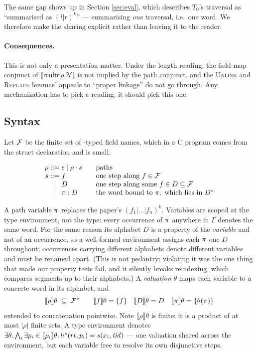 The same gap shows up in Section \ref{sec:eval}, which describes $T_0$'s
traversal as ``summarised as $(l|r)^{k}$'' --- summarising \emph{one} traversal,
i.e.\ one word.  We therefore make the sharing explicit rather than leaving it to
the reader.

\paragraph{Consequences.}  This is not only a presentation matter.  Under the
length reading, the field-map conjunct of $\llbracket \textsf{rcuItr}\,\rho\,
\mathcal{N} \rrbracket$ is not implied by the path conjunct, and the
\textsc{Unlink} and \textsc{Replace} lemmas' appeals to ``proper linkage'' do not
go through.  Any mechanization has to pick a reading; it should pick this one.

\subsection{Syntax}
\label{sec:pathfrag-syntax}

Let $\mathcal{F}$ be the finite set of \RCU-typed field names, which in a C program
comes from the struct declaration and is small.

\[
\begin{array}{r@{\;}c@{\;}l@{\qquad}l}
\rho &::=& \epsilon \mid \rho \cdot s & \text{paths} \\
s    &::=& f                 & \text{one step along } f \in \Fields \\
     &\mid& D                & \text{one step along some } f \in D \subseteq \Fields \\
     &\mid& \pvar : D        & \text{the word bound to } \pvar,\ \text{which lies in } D^{*}
\end{array}
\]

A path variable $\pi$ replaces the paper's $(f_1|\ldots|f_n)^{k}$.  Variables
are scoped at the type environment, not the type: every occurrence of $\pi$
anywhere in $\Gamma$ denotes the same word.  For the same reason its alphabet
$D$ is a property of the \emph{variable} and not of an occurrence, so a
well-formed environment assigns each $\pi$ one $D$ throughout; occurrences
carrying different alphabets denote different variables and must be renamed
apart.  (This is not pedantry: violating it was the one thing that made our
property tests fail, and it silently breaks reindexing, which compares segments
up to their alphabets.)  A \emph{valuation} $\theta$ maps
each variable to a concrete word in its alphabet, and
\[
\llbracket \rho \rrbracket\theta \;\subseteq\; \mathcal{F}^{*}
\qquad
\llbracket f \rrbracket\theta = \{f\}
\quad
\llbracket D \rrbracket\theta = D
\quad
\llbracket \pi \rrbracket\theta = \{\theta(\pi)\}
\]
extended to concatenation pointwise.  Note $\llbracket \rho \rrbracket\theta$ is
finite: it is a product of at most $|\rho|$ finite sets.  A type environment
denotes $\exists\theta \ldotp \bigwedge_i \exists p_i \in \llbracket \rho_i
\rrbracket\theta \ldotp h^{*}(rt,p_i) = s(x_i,\mathit{tid})$ --- one valuation
shared across the environment, but each variable free to resolve its own
disjunctive steps.

